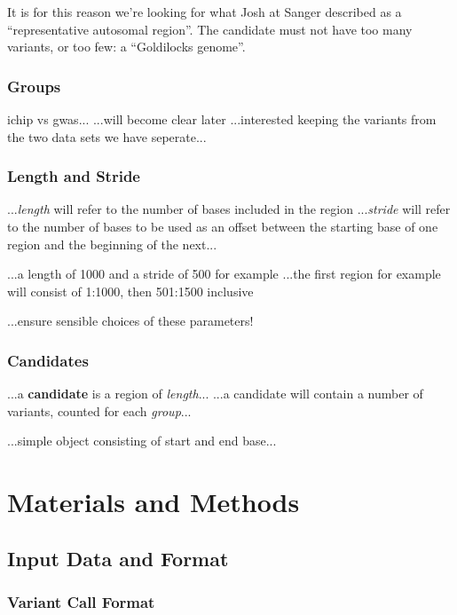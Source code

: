 It is for this reason we’re looking for what Josh at Sanger described as a
“representative autosomal region”. The candidate must not have too many
variants, or too few: a “Goldilocks genome”.


\subsection{Groups}

ichip vs gwas...
...will become clear later
...interested keeping the variants from the two data sets we have seperate...


\subsection{Length and Stride}
\label{sec:lengthstride}

...\textit{length} will refer to the number of bases included in the region
...\textit{stride} will refer to the number of bases to be used as an offset
between the starting base of one region and the beginning of the
next...

...a length of 1000 and a stride of 500 for example
...the first region for example will consist of 1:1000, then 501:1500 inclusive

...ensure sensible choices of these parameters!


\subsection{Candidates}

...a \textbf{candidate} is a region of \textit{length}...
...a candidate will contain a number of variants, counted for each
\textit{group}...

...simple object consisting of start and end base...



\chapter{Materials and Methods}
\section{Input Data and Format}
\subsection{Variant Call Format}

